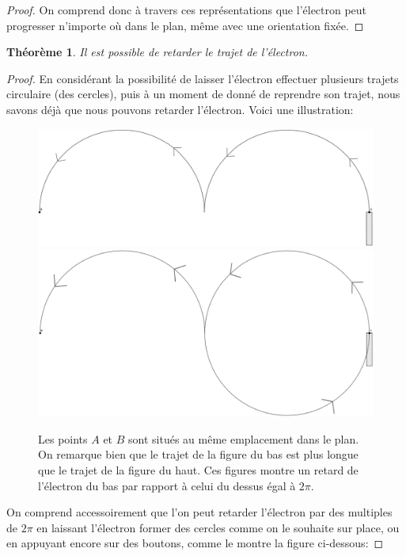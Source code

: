 \documentclass{amsart}
\newtheorem{theorem}{Théorème}[section]
\theoremstyle{definition}
\theoremstyle{remark}
\numberwithin{equation}{section}
\begin{document}
\begin{proof}
  On comprend donc à travers ces représentations que l'électron peut progresser n'importe où dans le plan, même avec une orientation fixée.

\end{proof}

\begin{theorem}
  Il est possible de retarder le trajet de l'électron.
\end{theorem}

\begin{proof}
  En considérant la possibilité de laisser l'électron effectuer plusieurs trajets circulaire (des cercles), puis à un moment de donné de reprendre son trajet, nous savons déjà que nous pouvons retarder l'électron. Voici une illustration:

  \begin{figure}[H]
    \centering
    \includegraphics[scale=0.14]{images/not_long.png}
    \includegraphics[scale=0.13]{images/really_long.png}
    \caption{Les points $A$ et $B$ sont situés au même emplacement dans le plan. On remarque bien que le trajet de la figure du bas est plus longue que le trajet de la figure du haut. Ces figures montre un retard de l'électron du bas par rapport à celui du dessus égal à $2\pi$.}
  \end{figure}

  On comprend accessoirement que l'on peut retarder l'électron par des multiples de $2\pi$ en laissant l'électron former des cercles comme on le souhaite sur place, ou en appuyant encore sur des boutons, comme le montre la figure ci-dessous:


\end{proof}
\end{document}
